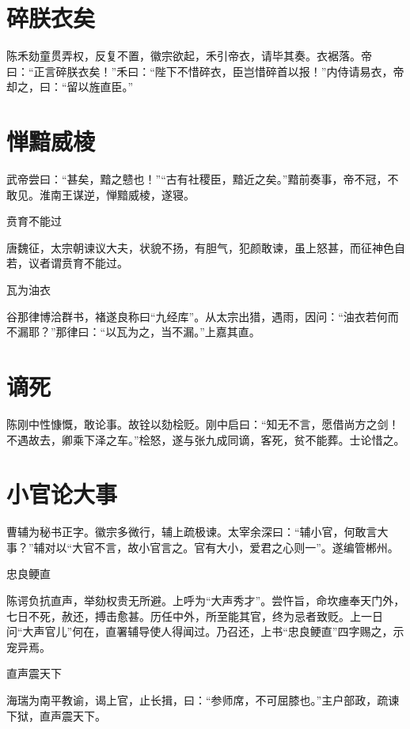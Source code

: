 \documentclass[a4paper,12pt,UTF8,twoside]{ctexbook}
\begin{document}
    \section{碎朕衣矣}
    
    陈禾劾童贯弄权，反复不置，徽宗欲起，禾引帝衣，请毕其奏。衣裾落。帝曰：“正言碎朕衣矣！”禾曰：“陛下不惜碎衣，臣岂惜碎首以报！”内侍请易衣，帝却之，曰：“留以旌直臣。”
    
    \section{惮黯威棱}
    
    武帝尝曰：“甚矣，黯之戆也！”“古有社稷臣，黯近之矣。”黯前奏事，帝不冠，不敢见。淮南王谋逆，惮黯威棱，遂寝。
    
    贲育不能过
    
    唐魏征，太宗朝谏议大夫，状貌不扬，有胆气，犯颜敢谏，虽上怒甚，而征神色自若，议者谓贲育不能过。
    
    瓦为油衣
    
    谷那律博洽群书，褚遂良称曰“九经库”。从太宗出猎，遇雨，因问：“油衣若何而不漏耶？”那律曰：“以瓦为之，当不漏。”上嘉其直。
    
    \section{谪死}
    
    陈刚中性慷慨，敢论事。故铨以劾桧贬。刚中启曰：“知无不言，愿借尚方之剑！不遇故去，卿乘下泽之车。”桧怒，遂与张九成同谪，客死，贫不能葬。士论惜之。
    
    \section{小官论大事}
    
    曹辅为秘书正字。徽宗多微行，辅上疏极谏。太宰余深曰：“辅小官，何敢言大事？”辅对以“大官不言，故小官言之。官有大小，爱君之心则一”。遂编管郴州。
    
    忠良鲠直
    
    陈谔负抗直声，举劾权贵无所避。上呼为“大声秀才”。尝忤旨，命坎瘗奉天门外，七日不死，赦还，搏击愈甚。历任中外，所至能其官，终为忌者致贬。上一日问“大声官儿”何在，直署辅导使人得闻过。乃召还，上书“忠良鲠直”四字赐之，示宠异焉。
    
    直声震天下
    
    海瑞为南平教谕，谒上官，止长揖，曰：“参师席，不可屈膝也。”主户部政，疏谏下狱，直声震天下。
    
\end{document}
